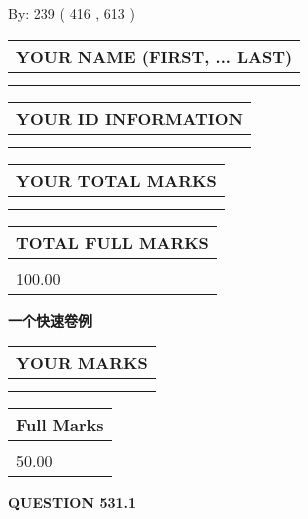 \documentclass{ctexart}
\begin{document}
   
\hspace{1.0in} By: 
 239 ( 416 ,  613 )
   
   
   
   
\newpage 
\setcounter{page}{ 
   531001 } 
   
   
   
   
\noindent\begin{tabular}{|l|}
\hline
YOUR NAME (FIRST, ... LAST)  \\
\hline
 \\ 
 \\ 
\hline
\end{tabular}
\hspace{0.05in} \begin{tabular}{|l|}
\hline
 YOUR   ID   INFORMATION  \\
\hline
 \\ 
 \\ 
\hline
\end{tabular}
   
   
\vspace{0.2in}\noindent\begin{tabular}{|l|}
\hline
YOUR TOTAL MARKS  \\
\hline
 \\ 
 \\ 
\hline
\end{tabular}
\hspace{0.05in} \begin{tabular}{|l|}
\hline
TOTAL FULL MARKS  \\
\hline
 \\ 
100.00 \\
\hline
\end{tabular}
   
   
 \vspace{0.2in}
{\LARGE {\textbf{ 一个快速卷例}}}
   
   
  
\vspace{0.2in}
  
\noindent\begin{tabular}{|l|}
\hline
 YOUR MARKS  \\
\hline
 \\ 
 \\ 
\hline
\end{tabular}
\hspace{0.05in} \begin{tabular}{|l|}
\hline
 Full Marks  \\
\hline
 \\ 
50.00 \\
\hline
\end{tabular}
{\textbf{\Large{QUESTION
531.1 
}}}
  
\end{document}
